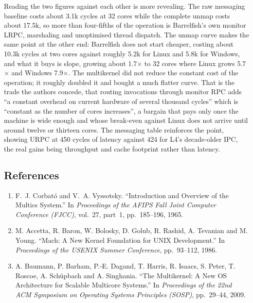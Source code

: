 Reading the two figures against each other is more revealing. The raw messaging baseline
costs about 3.1k cycles at 32 cores while the complete unmap costs about 17.5k, so more
than four-fifths of the operation is Barrelfish's own monitor LRPC, marshaling and
unoptimised thread dispatch. The unmap curve makes the same point at the other end:
Barrelfish does not start cheaper, costing about 10.3k cycles at two cores against roughly
5.2k for Linux and 5.8k for Windows, and what it buys is slope, growing about
1.7$\times$ to 32 cores where Linux grows 5.7$\times$ and Windows 7.9$\times$. The
multikernel did not reduce the constant cost of the operation; it roughly doubled it and
bought a much flatter curve. That is the trade the authors concede, that routing
invocations through monitor RPC adds ``a constant overhead on current hardware of several
thousand cycles'' which is ``constant as the number of cores increases'', a bargain that
pays only once the machine is wide enough and whose break-even against Linux does not
arrive until around twelve or thirteen cores. The messaging table reinforces the point,
showing URPC at 450 cycles of latency against 424 for L4's decade-older IPC, the real gains
being throughput and cache footprint rather than latency.


\subsection*{References}
\label{p4:sec:refs}

\begin{enumerate}
  \item[{[1]}] F.~J. Corbat\'o and V.~A. Vyssotsky. ``Introduction and Overview of the
    Multics System.'' In \emph{Proceedings of the AFIPS Fall Joint Computer Conference
    (FJCC)}, vol.~27, part~1, pp.~185--196, 1965.
  \item[{[2]}] M. Accetta, R. Baron, W. Bolosky, D. Golub, R. Rashid, A. Tevanian and
    M. Young. ``Mach: A New Kernel Foundation for UNIX Development.'' In \emph{Proceedings
    of the USENIX Summer Conference}, pp.~93--112, 1986.
  \item[{[3]}] A. Baumann, P. Barham, P.-E. Dagand, T. Harris, R. Isaacs, S. Peter,
    T. Roscoe, A. Sch\"upbach and A. Singhania. ``The Multikernel: A New OS Architecture for
    Scalable Multicore Systems.'' In \emph{Proceedings of the 22nd ACM Symposium on Operating
    Systems Principles (SOSP)}, pp.~29--44, 2009.
\end{enumerate}
